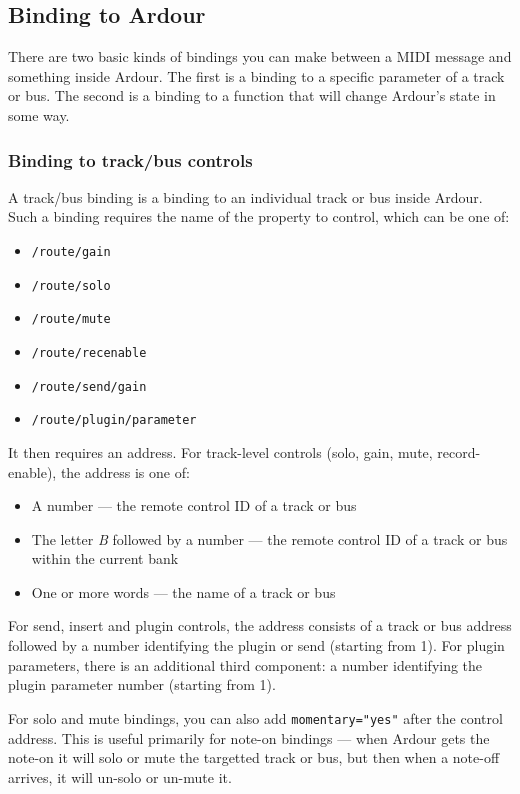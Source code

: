 \documentclass[10pt,a4paper]{book}
\begin{document}
\subsection{Binding to Ardour}

There are two basic kinds of bindings you can make between a MIDI
message and something inside Ardour. The first is a binding to a
specific parameter of a track or bus. The second is a binding to a
function that will change Ardour's state in some way. 


\subsubsection{Binding to track/bus controls}

A track/bus binding is a binding to an individual track or bus inside
Ardour.  Such a binding requires the name of the property to control,
which can be one of:

\begin{itemize}
\item \texttt{/route/gain}
\item \texttt{/route/solo}
\item \texttt{/route/mute}
\item \texttt{/route/recenable}
\item \texttt{/route/send/gain}
\item \texttt{/route/plugin/parameter}
\end{itemize}

It then requires an address.  For track-level controls (solo, gain, mute, record-enable), the address is one of:

\begin{itemize}
\item A number --- the remote control ID of a track or bus
\item The letter \emph{B} followed by a number --- the remote control ID of a track or bus within the current bank
\item One or more words --- the name of a track or bus
\end{itemize}

For send, insert and plugin controls, the address consists of a track
or bus address followed by a number identifying the plugin or send
(starting from 1).  For plugin parameters, there is an additional third
component: a number identifying the plugin parameter number (starting
from 1).

For solo and mute bindings, you can also add \texttt{momentary="yes"} after the
control address. This is useful primarily for note-on bindings --- when
Ardour gets the note-on it will solo or mute the targetted track or
bus, but then when a note-off arrives, it will un-solo or un-mute it.
\end{document}
